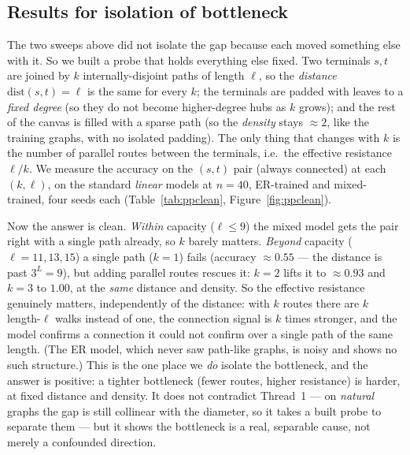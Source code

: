 \documentclass[11pt,a4paper]{article}
\begin{document}
\subsection{Results for isolation of bottleneck}
\label{sec:ppclean}

The two sweeps above did not isolate the gap because each moved something else with it. So we
built a probe that holds everything else fixed. Two terminals $s,t$ are joined by $k$
internally-disjoint paths of length $\ell$, so the \emph{distance} $\mathrm{dist}(s,t)=\ell$ is
the same for every $k$; the terminals are padded with leaves to a \emph{fixed degree} (so they do
not become higher-degree hubs as $k$ grows); and the rest of the canvas is filled with a sparse
path (so the \emph{density} stays $\approx2$, like the training graphs, with no isolated padding).
The only thing that changes with $k$ is the number of parallel routes between the terminals, i.e.\
the effective resistance $\ell/k$. We measure the accuracy on the $(s,t)$ pair (always connected)
at each $(k,\ell)$, on the standard \emph{linear} models at $n=40$, ER-trained and mixed-trained,
four seeds each (Table~\ref{tab:ppclean}, Figure~\ref{fig:ppclean}).

Now the answer is clean. \emph{Within} capacity ($\ell\le9$) the mixed model gets the pair right
with a single path already, so $k$ barely matters. \emph{Beyond} capacity ($\ell=11,13,15$) a
single path ($k=1$) fails (accuracy $\approx0.55$ --- the distance is past $3^L=9$), but adding
parallel routes rescues it: $k=2$ lifts it to $\approx0.93$ and $k=3$ to $1.00$, at the
\emph{same} distance and density. So the effective resistance genuinely matters, independently of
the distance: with $k$ routes there are $k$ length-$\ell$ walks instead of one, the connection
signal is $k$ times stronger, and the model confirms a connection it could not confirm over a
single path of the same length. (The ER model, which never saw path-like graphs, is noisy and
shows no such structure.) This is the one place we \emph{do} isolate the bottleneck, and the
answer is positive: a tighter bottleneck (fewer routes, higher resistance) is harder, at fixed
distance and density. It does not contradict Thread~1 --- on \emph{natural} graphs the gap is
still collinear with the diameter, so it takes a built probe to separate them --- but it shows
the bottleneck is a real, separable cause, not merely a confounded direction.
\end{document}
